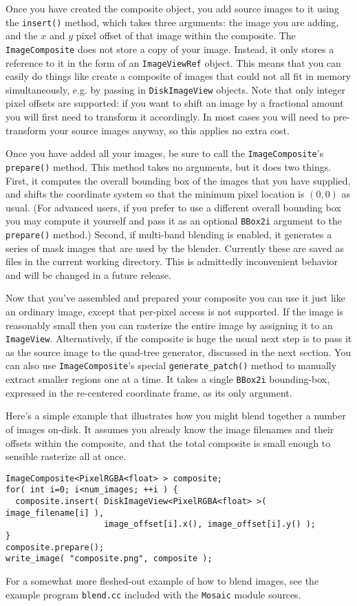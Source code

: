Once you have created the composite object, you add source images to
it using the \verb#insert()# method, which takes three arguments: the
image you are adding, and the $x$ and $y$ pixel offset of that image
within the composite.  The \verb#ImageComposite# does not store a copy
of your image.  Instead, it only stores a reference to it in the form
of an \verb#ImageViewRef# object.  This means that you can easily do
things like create a composite of images that could not all fit in
memory simultaneously, e.g. by passing in \verb#DiskImageView#
objects.  Note that only integer pixel offsets are supported: if you
want to shift an image by a fractional amount you will first need to
transform it accordingly.  In most cases you will need to
pre-transform your source images anyway, so this applies no extra
cost.  

Once you have added all your images, be sure to call the
\verb#ImageComposite#'s \verb#prepare()# method.  This method takes no
arguments, but it does two things.  First, it computes the overall
bounding box of the images that you have supplied, and shifts the
coordinate system so that the minimum pixel location is $(0,0)$ as
usual.  (For advanced users, if you prefer to use a different overall
bounding box you may compute it yourself and pass it as an optional
\verb#BBox2i# argument to the \verb#prepare()# method.)  Second, if
multi-band blending is enabled, it generates a series of mask images
that are used by the blender.  Currently these are saved as files in
the current working directory.  This is admittedly inconvenient
behavior and will be changed in a future release.

Now that you've assembled and prepared your composite you can use 
it just like an ordinary image, except that per-pixel access is 
not supported.  If the image is reasonably small then you can 
rasterize the entire image by assigning it to an \verb#ImageView#. 
Alternatively, if the composite is huge the usual next step is to 
pass it as the source image to the quad-tree generator, discussed 
in the next section.  You can also use \verb#ImageComposite#'s 
special \verb#generate_patch()# method to manually extract smaller 
regions one at a time.  It takes a single \verb#BBox2i# bounding-box, 
expressed in the re-centered coordinate frame, as its only argument.

Here's a simple example that illustrates how you might blend 
together a number of images on-disk.  It assumes you already know 
the image filenames and their offsets within the composite, and 
that the total composite is small enough to sensible rasterize all 
at once.
\begin{verbatim}
ImageComposite<PixelRGBA<float> > composite;
for( int i=0; i<num_images; ++i ) {
  composite.insert( DiskImageView<PixelRGBA<float> >( image_filename[i] ),
                    image_offset[i].x(), image_offset[i].y() );
}
composite.prepare();
write_image( "composite.png", composite );
\end{verbatim}
For a somewhat more fleshed-out example of how to blend images, 
see the example program \verb#blend.cc# included with the 
\verb#Mosaic# module sources.

